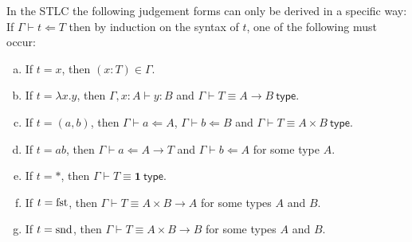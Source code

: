 \begin{lemma}\label{inversion}
    In the STLC the following judgement forms can only be derived in a specific way:
    If $\Gamma \vdash t \Leftarrow T$ then by induction on the syntax of $t$, one of the following must occur:
    \begin{enumerate}[(a)]
        \item If $t = x$, then $(x : T) \in \Gamma$.\label{inv_1_a}
        \item If $t = \lambda x . y$, then $\Gamma , x : A \vdash y : B$ and $\Gamma \vdash T \equiv A \to B \ \mathsf{type}$.\label{inv_1_b}
        \item If $t = (a , b)$, then $\Gamma \vdash a \Leftarrow A$, $\Gamma \vdash b \Leftarrow B$ and $\Gamma \vdash T \equiv A \times B \ \mathsf{type}$.\label{inv_1_c}
        \item If $t = a b$, then $\Gamma \vdash a \Leftarrow A \to T$ and $\Gamma \vdash b \Leftarrow A$ for some type $A$.\label{inv_1_d}
        \item If $t = *$, then $\Gamma \vdash T \equiv \mathbf{1}\ \mathsf{type}$.\label{inv_1_e}
        \item If $t = \mathrm{fst}$, then $\Gamma \vdash T \equiv A \times B \to A$ for some types $A$ and $B$.\label{inv_1_f}
        \item If $t = \mathrm{snd}$, then $\Gamma \vdash T \equiv A \times B \to B$ for some types $A$ and $B$.\label{inv_1_g}
    \end{enumerate}
\end{lemma}


